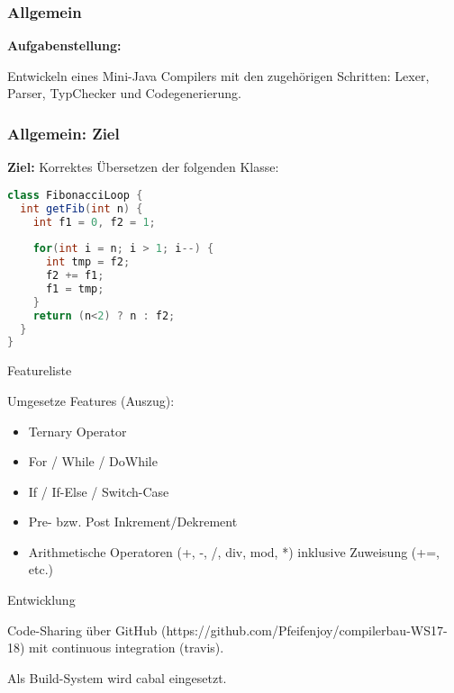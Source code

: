 \begin{frame}
	\frametitle{Allgemein}
	
\textbf{Aufgabenstellung:}

Entwickeln eines Mini-Java Compilers mit den zugehörigen Schritten: Lexer, Parser, TypChecker und Codegenerierung.
\end{frame}

\begin{frame}[fragile]
\frametitle{Allgemein: Ziel}

\textbf{Ziel:} Korrektes Übersetzen der folgenden Klasse:

\begin{lstlisting}[language=Java]
class FibonacciLoop {
  int getFib(int n) {
    int f1 = 0, f2 = 1;
   
    for(int i = n; i > 1; i--) {
      int tmp = f2;
      f2 += f1;
      f1 = tmp;
    }
    return (n<2) ? n : f2;
  }
}
\end{lstlisting}	
\end{frame}



\begin{frame}{Featureliste}

Umgesetze Features (Auszug):

\begin{itemize}
	\item Ternary Operator
	\item For / While / DoWhile 
	\item If / If-Else / Switch-Case
	\item Pre- bzw. Post Inkrement/Dekrement
	\item Arithmetische Operatoren (+, -, /, div, mod, *) inklusive Zuweisung (+=, etc.)
\end{itemize}	
\end{frame}

\begin{frame}{Entwicklung}

Code-Sharing über GitHub (https://github.com/Pfeifenjoy/compilerbau-WS17-18) mit continuous integration (travis).

\par \medskip

Als Build-System wird cabal eingesetzt.	
\end{frame}

